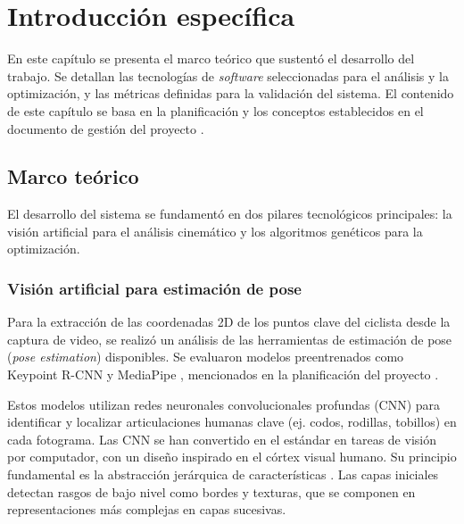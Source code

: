 
\chapter{Introducción específica}
\label{Chapter2}


En este capítulo se presenta el marco teórico que sustentó el desarrollo del
trabajo. Se detallan las tecnologías de \textit{software} seleccionadas para el
análisis y la optimización, y las métricas definidas para la validación del
sistema. El contenido de este capítulo se basa en la planificación y los
conceptos establecidos en el documento de gestión del proyecto
\citep{RGv5Goni}. %


\section{Marco teórico}
\label{sec:marco_teorico}

El desarrollo del sistema se fundamentó en dos pilares tecnológicos
principales: la visión artificial para el análisis cinemático y los algoritmos
genéticos para la optimización.

\subsection{Visión artificial para estimación de pose}
\label{ssec:vision_pose}

Para la extracción de las coordenadas 2D de los puntos clave del ciclista desde
la captura de video, se realizó un análisis de las herramientas de estimación
de pose (\textit{pose estimation}) disponibles. Se evaluaron modelos
preentrenados como Keypoint R-CNN \citep{maskrcnn} y MediaPipe \citep{MediaPipe}, mencionados en la planificación
del proyecto \citep{RGv5Goni}.

Estos modelos utilizan redes neuronales convolucionales profundas (CNN) para
identificar y localizar articulaciones humanas clave (ej. codos, rodillas,
tobillos) en cada fotograma. Las CNN se han convertido en el estándar en tareas
de visión por computador, con un diseño inspirado en el córtex visual humano.
Su principio fundamental es la abstracción jerárquica de características
\citep{oshea2015introduction}. Las capas iniciales detectan rasgos de bajo
nivel como bordes y texturas, que se componen en representaciones más complejas
en capas sucesivas.

